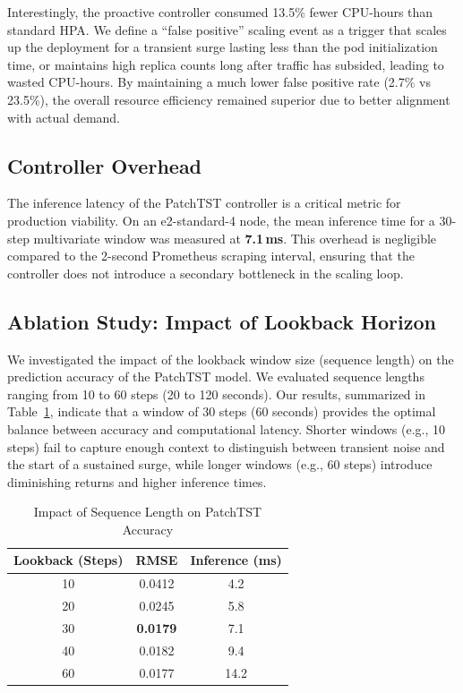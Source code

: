 \documentclass[conference]{IEEEtran}
\begin{document}
Interestingly, the proactive controller consumed 13.5\% fewer CPU-hours than standard HPA. We define a ``false positive'' scaling event as a trigger that scales up the deployment for a transient surge lasting less than the pod initialization time, or maintains high replica counts long after traffic has subsided, leading to wasted CPU-hours. By maintaining a much lower false positive rate (2.7\% vs 23.5\%), the overall resource efficiency remained superior due to better alignment with actual demand.

\subsection{Controller Overhead}
The inference latency of the PatchTST controller is a critical metric for production viability. On an e2-standard-4 node, the mean inference time for a 30-step multivariate window was measured at \textbf{7.1\,ms}. This overhead is negligible compared to the 2-second Prometheus scraping interval, ensuring that the controller does not introduce a secondary bottleneck in the scaling loop.

\subsection{Ablation Study: Impact of Lookback Horizon}
We investigated the impact of the lookback window size (sequence length) on the prediction accuracy of the PatchTST model. We evaluated sequence lengths ranging from 10 to 60 steps (20 to 120 seconds). Our results, summarized in Table~\ref{tab:ablation}, indicate that a window of 30 steps (60 seconds) provides the optimal balance between accuracy and computational latency. Shorter windows (e.g., 10 steps) fail to capture enough context to distinguish between transient noise and the start of a sustained surge, while longer windows (e.g., 60 steps) introduce diminishing returns and higher inference times.

\begin{table}[htbp]
\caption{Impact of Sequence Length on PatchTST Accuracy}
\label{tab:ablation}
\centering
\begin{tabular}{ccc}
\toprule
\textbf{Lookback (Steps)} & \textbf{RMSE} & \textbf{Inference (ms)} \\
\midrule
10 & 0.0412 & 4.2 \\
20 & 0.0245 & 5.8 \\
30 & \textbf{0.0179} & 7.1 \\
40 & 0.0182 & 9.4 \\
60 & 0.0177 & 14.2 \\
\bottomrule
\end{tabular}
\end{table}
\end{document}
